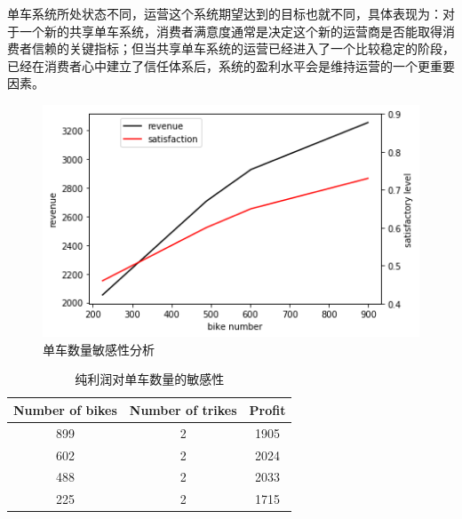 \documentclass[]{tongjithesis}
\numberwithin{equation}{chapter}
\begin{document}
单车系统所处状态不同，运营这个系统期望达到的目标也就不同，具体表现为：对于一个新的共享单车系统，消费者满意度通常是决定这个新的运营商是否能取得消费者信赖的关键指标；但当共享单车系统的运营已经进入了一个比较稳定的阶段，已经在消费者心中建立了信任体系后，系统的盈利水平会是维持运营的一个更重要因素。
\begin{figure}[H]
    \centering
    \includegraphics[width=0.7 \textwidth]{figures_main/sensitivity_bike.png}
    \caption{单车数量敏感性分析}
    \label{sens_bike}
\end{figure}

\begin{table}[H]
    \centering
    \caption{纯利润对单车数量的敏感性}
    \label{sens_profit}
    \begin{tabular}{c|c|c}
    \hline
    \textbf{Number of bikes} &\textbf{Number of trikes} &\textbf{Profit}\\
    \hline
    899 &2 &1905\\
    602 &2 &2024\\
    488 &2 &2033\\
    225 &2 &1715\\
    \hline
    \end{tabular}
\end{table}
\end{document}
